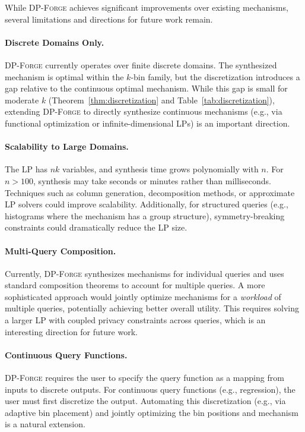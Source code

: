 \documentclass[11pt,a4paper]{article}
\newcommand{\dpforge}{\textsc{DP-Forge}}
\begin{document}
While \dpforge{} achieves significant improvements over existing mechanisms,
several limitations and directions for future work remain.

\paragraph{Discrete Domains Only.}
\dpforge{} currently operates over finite discrete domains.  The synthesized
mechanism is optimal within the $k$-bin family, but the discretization introduces
a gap relative to the continuous optimal mechanism.  While this gap is small for
moderate $k$ (Theorem~\ref{thm:discretization} and Table~\ref{tab:discretization}),
extending \dpforge{} to directly synthesize continuous mechanisms (e.g., via
functional optimization or infinite-dimensional LPs) is an important direction.

\paragraph{Scalability to Large Domains.}
The LP has $nk$ variables, and synthesis time grows polynomially with $n$.  For
$n > 100$, synthesis may take seconds or minutes rather than milliseconds.
Techniques such as column generation, decomposition methods, or approximate LP
solvers could improve scalability.  Additionally, for structured queries
(e.g., histograms where the mechanism has a group structure), symmetry-breaking
constraints could dramatically reduce the LP size.

\paragraph{Multi-Query Composition.}
Currently, \dpforge{} synthesizes mechanisms for individual queries and uses
standard composition theorems to account for multiple queries.  A more
sophisticated approach would jointly optimize mechanisms for a \emph{workload}
of multiple queries, potentially achieving better overall utility.  This
requires solving a larger LP with coupled privacy constraints across queries,
which is an interesting direction for future work.

\paragraph{Continuous Query Functions.}
\dpforge{} requires the user to specify the query function as a mapping from
inputs to discrete outputs.  For continuous query functions (e.g., regression),
the user must first discretize the output.  Automating this discretization
(e.g., via adaptive bin placement) and jointly optimizing the bin positions
and mechanism is a natural extension.
\end{document}

